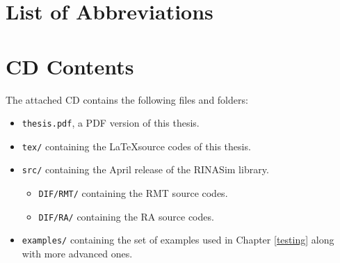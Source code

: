 \chapter{List of Abbreviations}

\chapter{CD Contents}
    The attached CD contains the following files and folders:

    \begin{itemize}
        \item \texttt{thesis.pdf}, a PDF version of this thesis.
        \item \texttt{tex/} containing the \LaTeX source codes of this thesis.
        \item \texttt{src/} containing the April release of the RINASim library.
        \begin{itemize}
            \item \texttt{DIF/RMT/} containing the RMT source codes.
            \item \texttt{DIF/RA/} containing the RA source codes.
        \end{itemize}
        \item \texttt{examples/} containing the set of examples used in Chapter \ref{testing} along with more advanced ones.
    \end{itemize}